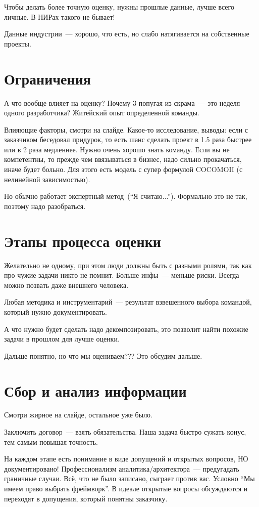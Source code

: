 \documentclass[12pt, a4paper, oneside]{memoir}
\begin{document}
Чтобы делать более точную оценку, нужны прошлые данные, лучше всего личные.
В НИРах такого не бывает!

Данные индустрии~--- хорошо, что есть, но слабо натягивается на собственные проекты.

\section*{Ограничения}

А что вообще влияет на оценку?
Почему 3 попугая из скрама~--- это неделя одного разработчика?
Житейский опыт определенной команды.

Влияющие факторы, смотри на слайде.
Какое-то исследование, выводы:
если с заказчиком беседовал придурок, то есть шанс сделать проект в 1.5 раза быстрее или в 2 раза медленнее.
Нужно очень хорошо знать команду.
Если вы не компетентны, то прежде чем ввязываться в бизнес, надо сильно прокачаться, иначе будет больно.
Для этого есть модель с супер формулой COCOMOII (с нелинейной зависимостью).

Но обычно работает экспертный метод~(\enquote{Я считаю...}).
Формально это не так, поэтому надо разобраться.

\section*{Этапы процесса оценки}

Желательно не одному, при этом люди должны быть с разными ролями, так как про чужие задачи никто не помнит.
Больше инфы~--- меньше риски.
Всегда можно позвать даже внешнего человека.

Любая методика и инструментарий~--- результат взвешенного выбора командой, который нужно документировать.

А что нужно будет сделать надо декомпозировать, это позволит найти похожие задачи в прошлом для лучше оценки.

Дальше понятно, но что мы оцениваем???
Это обсудим дальше.

\section*{Сбор и анализ информации}
Смотри жирное на слайде, остальное уже было.

Заключить договор~--- взять обязательства.
Наша задача быстро сужать конус, тем самым повышая точность.

На каждом этапе есть понимание в виде допущений и открытых вопросов, НО документировано!
Профессионализм аналитика/архитектора~--- предугадать граничные случаи.
Всё, что не было записано, сыграет против вас.
Условно \enquote{Мы имеем право выбрать фреймворк}.
В идеале открытые вопросы обсуждаются и переходят в допущения, который понятны заказчику.
\end{document}
